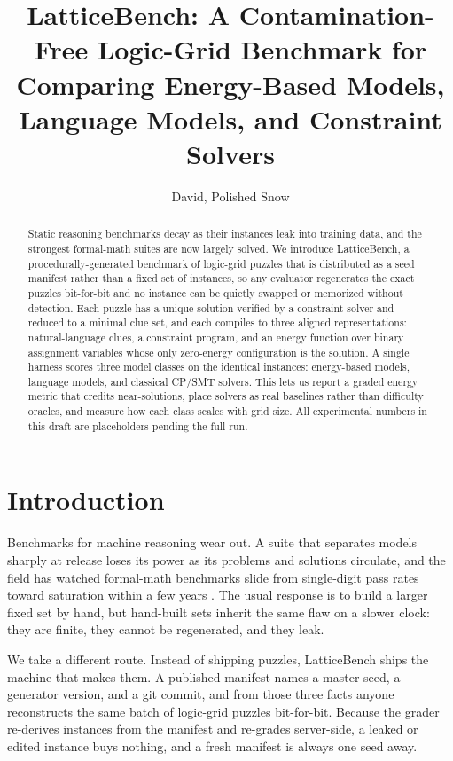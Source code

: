 \documentclass[11pt]{article}
\title{LatticeBench: A Contamination-Free Logic-Grid Benchmark for
Comparing Energy-Based Models, Language Models, and Constraint Solvers}
\author{David, Polished Snow}
\date{}
\begin{document}
\maketitle

\begin{abstract}
Static reasoning benchmarks decay as their instances leak into training data, and
the strongest formal-math suites are now largely solved. We introduce
LatticeBench, a procedurally-generated benchmark of logic-grid puzzles that is
distributed as a seed manifest rather than a fixed set of instances, so any
evaluator regenerates the exact puzzles bit-for-bit and no instance can be quietly
swapped or memorized without detection. Each puzzle has a unique solution verified
by a constraint solver and reduced to a minimal clue set, and each compiles to
three aligned representations: natural-language clues, a constraint program, and
an energy function over binary assignment variables whose only zero-energy
configuration is the solution. A single harness scores three model classes on the
identical instances: energy-based models, language models, and classical CP/SMT
solvers. This lets us report a graded energy metric that credits near-solutions,
place solvers as real baselines rather than difficulty oracles, and measure how
each class scales with grid size. All experimental numbers in this draft are
placeholders pending the full run.
\end{abstract}

\section{Introduction}

Benchmarks for machine reasoning wear out. A suite that separates models sharply
at release loses its power as its problems and solutions circulate, and the field
has watched formal-math benchmarks slide from single-digit pass rates toward
saturation within a few years \citep{minif2f}. The usual response is to build a
larger fixed set by hand, but hand-built sets inherit the same flaw on a slower
clock: they are finite, they cannot be regenerated, and they leak.

We take a different route. Instead of shipping puzzles, LatticeBench ships the
machine that makes them. A published manifest names a master seed, a generator
version, and a git commit, and from those three facts anyone reconstructs the same
batch of logic-grid puzzles bit-for-bit. Because the grader re-derives instances
from the manifest and re-grades server-side, a leaked or edited instance buys
nothing, and a fresh manifest is always one seed away.
\end{document}
